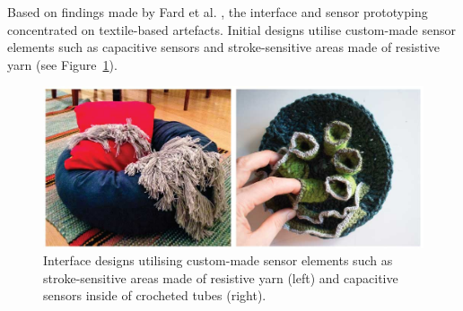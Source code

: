 \documentclass{chi-ext}
\begin{document}
\begin{multicols}{2}
Based on findings made by Fard et al. \cite{fard2012-wit}, the interface and sensor prototyping concentrated on textile-based artefacts. 
Initial designs utilise custom-made sensor elements such as capacitive sensors and stroke-sensitive areas made of resistive yarn (see Figure~\ref{fig:media_interfaces}).

\begin{figure}
		\includegraphics[width=\columnwidth]{media/interfaces.jpg}
	\caption{Interface designs utilising custom-made sensor elements such as stroke-sensitive areas made of resistive yarn (left) and capacitive sensors inside of crocheted tubes (right).}
	\label{fig:media_interfaces}
\end{figure}

% 
% 
% 
% 
% 
% 
% 
% 


\end{multicols}
\end{document}
